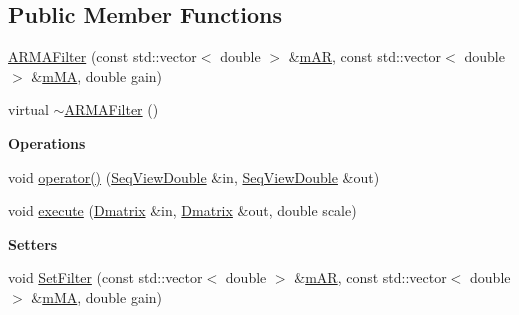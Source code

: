 \subsection*{Public Member Functions}
\begin{DoxyCompactItemize}
\item 
\hyperlink{classtsa_1_1_a_r_m_a_filter_acfa4406559bb327a4bfd5139db46f941}{A\+R\+M\+A\+Filter} (const std\+::vector$<$ double $>$ \&\hyperlink{classtsa_1_1_a_r_m_a_filter_abadc75a208b4e28e28e7341c6bbfbbce}{m\+AR}, const std\+::vector$<$ double $>$ \&\hyperlink{classtsa_1_1_a_r_m_a_filter_aa4b780d4db5a5c5326e92f1c766613fb}{m\+MA}, double gain)
\item 
virtual \hyperlink{classtsa_1_1_a_r_m_a_filter_affe37273b08f1c5f21a9d11170f1a119}{$\sim$\+A\+R\+M\+A\+Filter} ()
\end{DoxyCompactItemize}
\begin{Indent}\textbf{ Operations}\par
\begin{DoxyCompactItemize}
\item 
void \hyperlink{classtsa_1_1_a_r_m_a_filter_af5ff08e872b2cbb13221c8e90158c3a3}{operator()} (\hyperlink{namespacetsa_ac599574bcc094eda25613724b8f3ca9e}{Seq\+View\+Double} \&in, \hyperlink{namespacetsa_ac599574bcc094eda25613724b8f3ca9e}{Seq\+View\+Double} \&out)
\item 
void \hyperlink{classtsa_1_1_a_r_m_a_filter_a9c0be1ce8ede64c97bc2845423d7380f}{execute} (\hyperlink{namespacetsa_ad260cd21c1891c4ed391fe788569aba4}{Dmatrix} \&in, \hyperlink{namespacetsa_ad260cd21c1891c4ed391fe788569aba4}{Dmatrix} \&out, double scale)
\end{DoxyCompactItemize}
\end{Indent}
\begin{Indent}\textbf{ Setters}\par
\begin{DoxyCompactItemize}
\item 
void \hyperlink{classtsa_1_1_a_r_m_a_filter_a4665d54649f2e971303429dea11a6ae5}{Set\+Filter} (const std\+::vector$<$ double $>$ \&\hyperlink{classtsa_1_1_a_r_m_a_filter_abadc75a208b4e28e28e7341c6bbfbbce}{m\+AR}, const std\+::vector$<$ double $>$ \&\hyperlink{classtsa_1_1_a_r_m_a_filter_aa4b780d4db5a5c5326e92f1c766613fb}{m\+MA}, double gain)
\end{DoxyCompactItemize}
\end{Indent}

